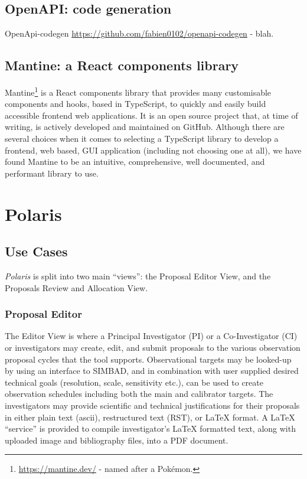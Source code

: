 \documentclass[11pt,twoside]{article}
\begin{document}
\subsection{OpenAPI: code generation}\label{subsec:openapi-code-generation}

OpenApi-codegen \url{https://github.com/fabien0102/openapi-codegen}  - blah.

\subsection{Mantine: a React components library}\label{subsec:mantine:-a-react-components-library}

Mantine\footnote{\url{https://mantine.dev/} - named after a Pok\'emon.} is a React components library that
provides many customisable components and hooks, based in TypeScript, to quickly and easily build accessible
frontend web applications.
It is an open source project that, at time of writing, is actively developed and maintained on GitHub.
Although there are several choices when it comes to selecting a TypeScript library to develop a frontend,
web based, GUI application (including not choosing one at all), we have found Mantine to be an intuitive,
comprehensive, well documented, and performant library to use.


\section{Polaris}\label{sec:polaris}

\subsection{Use Cases}\label{subsec:use-cases}

\emph{Polaris} is split into two main ``views'': the Proposal Editor View, and the Proposals Review
and Allocation View.

\subsubsection{Proposal Editor}\label{subsubsec:proposal-editor}


The Editor View is where a Principal Investigator (PI) or a Co-Investigator (CI) or investigators may create,
edit, and submit proposals to the various observation proposal cycles that the tool supports.
Observational targets may be looked-up by using an interface to SIMBAD, and in combination with user
supplied desired technical goals (resolution, scale, sensitivity etc.), can be used to create observation
schedules including both the main and calibrator targets.
The investigators may provide scientific and technical justifications for their proposals in either plain text
(ascii), restructured text (RST), or LaTeX format.
A LaTeX ``service'' is provided to compile investigator's LaTeX formatted text, along with uploaded image
and bibliography files, into a PDF document.
\end{document}
